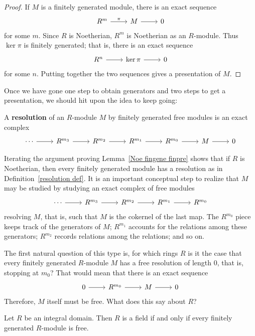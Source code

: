 \begin{proof}
If $M$ is a finitely generated module, there is an exact sequence
\[\begin{tikzcd}
R^{m}\ar[r,"\pi"]&M\ar[r]&0
\end{tikzcd}\]
for some $m$. Since $R$ is Noetherian, $R^m$ is Noetherian as an $R$-module. Thus $\ker\pi$ is finitely generated; that is, there is an exact sequence
\[\begin{tikzcd}
R^{n}\ar[r]&\ker\pi\ar[r]&0
\end{tikzcd}\]
for some $n$. Putting together the two sequences gives a presentation of $M$.
\end{proof}
Once we have gone one step to obtain generators and two steps to get a presentation, we should hit upon the idea to keep going:
\begin{definition}\label{resolution def}
A \textbf{resolution} of an $R$-module $M$ by finitely generated free modules is an exact complex
\[\begin{tikzcd}
\cdots\ar[r]&R^{m_3}\ar[r]&R^{m_2}\ar[r]&R^{m_1}\ar[r]&R^{m_0}\ar[r]&M\ar[r]&0
\end{tikzcd}\]
\end{definition}
Iterating the argument proving Lemma~\ref{Noe fingene finpre} shows that if $R$ is Noetherian, then
every finitely generated module has a resolution as in Definition~\ref{resolution def}. It is an important conceptual step to realize that $M$ may be studied by studying an exact complex of free modules
\[\begin{tikzcd}
\cdots\ar[r]&R^{m_3}\ar[r]&R^{m_2}\ar[r]&R^{m_1}\ar[r]&R^{m_0}
\end{tikzcd}\]
resolving $M$, that is, such that $M$ is the cokernel of the last map. The $R^{m_0}$ piece keeps track of the generators of $M$; $R^{m_1}$ accounts for the relations among these generators; $R^{m_2}$ records relations among the relations; and so on.\par
The first natural question of this type is, for which rings $R$ is it the case that every finitely generated $R$-module $M$ has a free resolution of length $0$, that is, stopping at $m_0$? That would mean that there is an exact sequence
\[\begin{tikzcd}
0\ar[r]&R^{m_0}\ar[r]&M\ar[r]&0
\end{tikzcd}\]
Therefore, $M$ itself must be free. What does this say about $R$?
\begin{proposition}\label{resolution length 0 iff field}
Let $R$ be an integral domain. Then $R$ is a field if and only if every finitely generated $R$-module is free.
\end{proposition}
